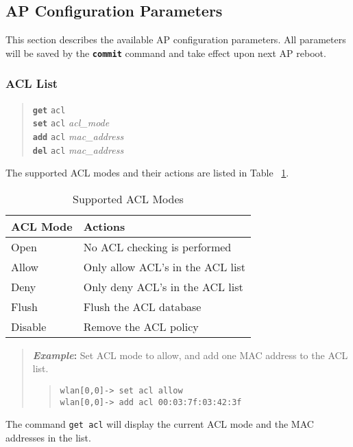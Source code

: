 \documentclass[10pt,fullpage]{article}
\newcommand{\mytt}[1]{{\texttt{#1}}}
\newcommand{\bv}{\begin{verse}}
\newcommand{\ev}{\end{verse}}
\newcommand{\clicmd}[1]{{\textbf{\texttt{#1}}}}
\newcommand{\cliparam}[1]{{\texttt{#1}}}
\newcommand{\clival}[1]{{\emph{#1}}}
\newcommand{\clidemo}[1]{{\texttt{wlan[0,0]-> #1}}}
\newenvironment{example}{\begin{quote}\textbf{\textit{Example}:}}{\end{quote}}
\begin{document}
\subsection{AP Configuration Parameters}
\label{sec:param}
This section describes the available AP configuration parameters.  All
parameters will be saved by the \clicmd{commit} command and take
effect upon next AP reboot.

\subsubsection{ACL List}
\bv
\clicmd{get} \cliparam{acl}\\
\clicmd{set} \cliparam{acl} \clival{acl\_mode}\\
\clicmd{add} \cliparam{acl} \clival{mac\_address}\\
\clicmd{del} \cliparam{acl} \clival{mac\_address}
\ev
The supported ACL modes and their actions are listed in Table ~\ref{tab:acl}.
\begin{table}[h*]
  \centering
  \begin{tabular}{|l|l|} \hline
    ACL Mode & Actions \\ \hline
    Open & No ACL checking is performed \\
    Allow & Only allow ACL's in the ACL list \\
    Deny & Only deny ACL's in the ACL list \\
    Flush & Flush the ACL database \\
    Disable & Remove the ACL policy \\ \hline
  \end{tabular}
  \caption{Supported ACL Modes}
  \label{tab:acl}
\end{table}

\begin{example}
  Set ACL mode to allow, and add one MAC address to the ACL list.
  \bv
  \clidemo{set acl allow}\\
  \clidemo{add acl 00:03:7f:03:42:3f}
  \ev
\end{example}

The command \mytt{get acl} will display the current ACL mode and the
MAC addresses in the list.
\end{document}
